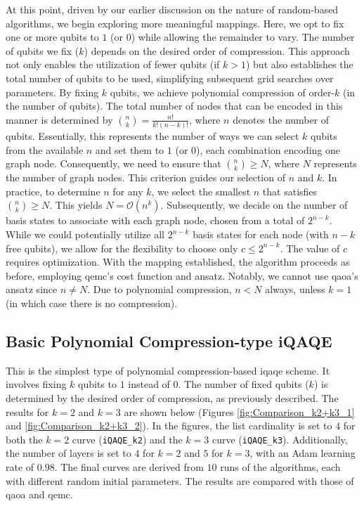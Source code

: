 At this point, driven by our earlier discussion on the nature of random-based algorithms, we begin exploring more meaningful mappings. Here, we opt to fix one or more qubits to $1$ (or $0$) while allowing the remainder to vary. The number of qubits we fix ($k$) depends on the desired order of compression. This approach not only enables the utilization of fewer qubits (if $k > 1$) but also establishes the total number of qubits to be used, simplifying subsequent grid searches over parameters. By fixing $k$ qubits, we achieve polynomial compression of order-$k$ (in the number of qubits). The total number of nodes that can be encoded in this manner is determined by $\binom{n}{k} = \frac{n!}{k!(n - k)!}$, where $n$ denotes the number of qubits. Essentially, this represents the number of ways we can select $k$ qubits from the available $n$ and set them to $1$ (or $0$), each combination encoding one graph node. Consequently, we need to ensure that $\binom{n}{k} \geq N$, where $N$ represents the number of graph nodes. This criterion guides our selection of $n$ and $k$. In practice, to determine $n$ for any $k$, we select the smallest $n$ that satisfies $\binom{n}{k} \geq N$. This yields $N = \mathcal{O}(n^k)$. Subsequently, we decide on the number of basis states to associate with each graph node, chosen from a total of $2^{n-k}$. While we could potentially utilize all $2^{n-k}$ basis states for each node (with $n-k$ free qubits), we allow for the flexibility to choose only $c \leq 2^{n-k}$. The value of $c$ requires optimization. With the mapping established, the algorithm proceeds as before, employing \acrshort{qemc}'s cost function and ansatz. Notably, we cannot use \acrshort{qaoa}'s ansatz since $n \neq N$. Due to polynomial compression, $n < N$ always, unless $k = 1$ (in which case there is no compression).






\subsection{Basic Polynomial Compression-type iQAQE}
\label{subsection:Basic_Poly-Comp_iQAQE}


This is the simplest type of polynomial compression-based \acrshort{iqaqe} scheme. It involves fixing $k$ qubits to $1$ instead of $0$. The number of fixed qubits ($k$) is determined by the desired order of compression, as previously described. The results for $k = 2$ and $k = 3$ are shown below (Figures \ref{fig:Comparison_k2+k3_1} and \ref{fig:Comparison_k2+k3_2}). In the figures, the list cardinality is set to $4$ for both the $k = 2$ curve (\texttt{iQAQE\_k2}) and the $k = 3$ curve (\texttt{iQAQE\_k3}). Additionally, the number of layers is set to $4$ for $k = 2$ and $5$ for $k = 3$, with an Adam learning rate of $0.98$. The final curves are derived from $10$ runs of the algorithms, each with different random initial parameters. The results are compared with those of \acrshort{qaoa} and \acrshort{qemc}.

